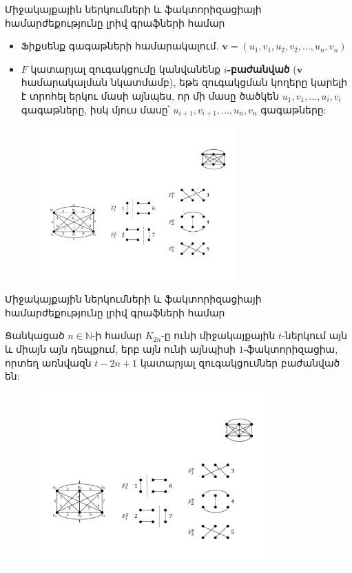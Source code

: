 \begin{frame}[shrink]{Միջակայքային ներկումների և ֆակտորիզացիայի համարժեքությունը լրիվ գրաֆների համար}

\begin{itemize}
\item Ֆիքսենք գագաթների համարակալում. $\mathbf{v} = \left(u_1,v_1, u_2,v_2, \ldots,u_n,v_n\right)$ 
\item $F$ կատարյալ զուգակցումը կանվանենք \textbf{$i$-բաժանված} ($\mathbf{v}$ համարակալման նկատմամբ), եթե զուգակցման կողերը կարելի է տրոհել երկու մասի այնպես, որ մի մասը ծածկեն $u_1, v_1, \ldots, u_i, v_i$ գագաթները, իսկ մյուս մասը՝ $u_{i+1}, v_{i+1}, \ldots, u_n, v_n$ գագաթները:
\end{itemize}


\begin{figure}[t!]
\centering
\includegraphics[width=0.7\textwidth]{figures/K_6factorization.pdf}
\label{K_6factorization}
\end{figure}
\end{frame}

\begin{frame}{Միջակայքային ներկումների և ֆակտորիզացիայի համարժեքությունը լրիվ գրաֆների համար}

\begin{theorem}[1.3.12]
Ցանկացած $n\in\mathbb{N}$-ի համար $K_{2n}$-ը ունի միջակայքային $t$-ներկում այն և միայն այն դեպքում, երբ այն ունի այնպիսի $1$-ֆակտորիզացիա, որտեղ առնվազն $t-2n+1$ կատարյալ զուգակցումներ բաժանված են:
\end{theorem}

\begin{figure}[t!]
\centering
\includegraphics[width=0.8\textwidth]{figures/K_6factorization.pdf}
\label{K_6factorization}
\end{figure}
\end{frame}